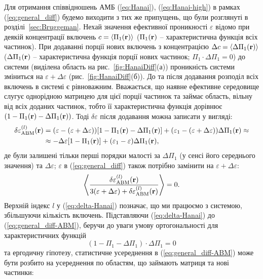 \documentclass[14pt,twoside]{vakthesis}
\begin{document}
Для отримання співвідношень АМБ (\ref{eq:Hanai}), (\ref{eq:Hanai-high}) в рамках (\ref{eq:general_diff}) будемо виходити з тих же припущень, що були розглянуті в розділі~\ref{sec:Bruggeman}. Нехай значення ефективної проникності $\varepsilon$ відомо при деякій концентрації включень $c = \langle  \Pi_1 ({\bf r}) \rangle$ ($\Pi_1 ({\bf r})$ -- характеристична функція всіх частинок). При додаванні порції нових включень з концентрацією $\Delta c = \langle \Delta\Pi_1({\bf r}) \rangle$ ($\Delta\Pi_1({\bf r})$ -- характеристична функція порції нових частинок; $\Pi_1 \cdot \Delta\Pi_1 = 0$) до системи (виділена область на рис.~\ref{fig:HanaiDiff}(а)) проникність системи зміниться на $\varepsilon + \Delta\varepsilon$ (рис.~\ref{fig:HanaiDiff}(б)).
До та після додавання розподіл всіх включень в системі є рівноважним. Вважається, що наявне ефективне середовище слугує однорідною матрицею для цієї порції частинок та займає область, вільну від всіх доданих частинок, тобто її характеристична функція дорівнює $(1 - \Pi_1 ({\bf r}) - \Delta\Pi_1({\bf r}))$.
Тоді $\delta\varepsilon$ після додавання можна записати у вигляді:
\begin{align}
\delta\varepsilon_{\rm ABM}^{(l)} ({\bf r}) &= (\varepsilon - (\varepsilon + \Delta\varepsilon)) [ 1 - \Pi_1 ({\bf r}) - \Delta\Pi_1 ({\bf r})]
+ (\varepsilon_1 - (\varepsilon + \Delta\varepsilon)) \Delta\Pi_1({\bf r}) \approx \nonumber\\
&\approx - \Delta\varepsilon [ 1 - \Pi_1 ({\bf r}) ] + (\varepsilon_1 - \varepsilon) \Delta\Pi_1({\bf r}),
\label{eq:delta-Hanai}
\end{align}
де були залишені тільки перші порядки малості за $\Delta \Pi_1$
(у сенсі його середнього значення) та $\Delta \varepsilon$;
$\varepsilon$ в (\ref{eq:general_diff}) також потрібно замінити
на $\varepsilon + \Delta\varepsilon$: 
\begin{equation}\label{eq:general_diff-ABM}
\left\langle \frac{\delta\varepsilon_{\rm ABM}^{(l)} ({\bf r})}{3(\varepsilon + \Delta\varepsilon) + \delta\varepsilon_{\rm ABM}^{(l)} ({\bf r})} \right\rangle = 0.
\end{equation}
Верхній індекс $l$ у (\ref{eq:delta-Hanai}) позначає, що ми працюємо з системою, збільшуючи кількість включень. Підставляючи (\ref{eq:delta-Hanai}) до (\ref{eq:general_diff-ABM}), беручи до уваги умову ортогональності для характеристичних функцій 
$$
(1 - \Pi_1 - \Delta\Pi_1)\cdot\Delta\Pi_1 = 0
$$ 
та ергодичну гіпотезу, статистичне усереднення в (\ref{eq:general_diff-ABM}) може бути розбито на усереднення по областям, що займають матриця та нові частинки:
\end{document}

